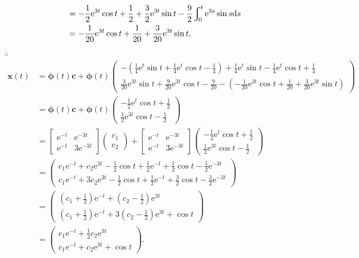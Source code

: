 \documentclass[12pt,UTF8]{ctexart}
\newcommand{\Int}[4]{\varint\nolimits_{#1}^{#2}#3\mathrm d#4}
\newcommand{\me}[0]{\mathrm e}
\begin{document}
\begin{enumerate}
\[\begin{aligned}
&=-\frac12\me^{3t}\cos t+\frac12+\frac32\me^{3t}\sin t-\frac92\Int0t{\me^{3s}\sin s}s\\
&=-\frac1{20}\me^{3t}\cos t+\frac1{20}+\frac3{20}\me^{3t}\sin t,
\end{aligned}\]
$\therefore$
\[\begin{aligned}
\bm x(t)&=\bm\phi(t)\bm c+\bm\phi(t)\begin{pmatrix}
-(\frac14\me^t\sin t+\frac14\me^t\cos t-\frac14)+\frac14\me^t\sin t-\frac14\me^t\cos t+\frac14\\
\frac3{20}\me^{3t}\sin t+\frac9{20}\me^{3t}\cos t-\frac9{20}-(-\frac1{20}\me^{3t}\cos t+\frac1{20}+\frac3{20}\me^{3t}\sin t)
\end{pmatrix}\\
&=\bm\phi(t)\bm c+\bm\phi(t)\begin{pmatrix}
-\frac12\me^t\cos t+\frac12\\
\frac12\me^{3t}\cos t-\frac12
\end{pmatrix}\\
&=\begin{bmatrix}\me^{-t}&\me^{-3t}\\\me^{-t}&3\me^{-3t}\end{bmatrix}\begin{pmatrix}
c_1\\c_2
\end{pmatrix}+\begin{bmatrix}\me^{-t}&\me^{-3t}\\\me^{-t}&3\me^{-3t}\end{bmatrix}\begin{pmatrix}
-\frac12\me^t\cos t+\frac12\\
\frac12\me^{3t}\cos t-\frac12
\end{pmatrix}\\
&=\begin{pmatrix}
c_1\me^{-t}+c_2\me^{3t}-\frac12\cos t+\frac12\me^{-t}+\frac12\cos t-\frac12\me^{-3t}\\
c_1\me^{-t}+3c_2\me^{3t}-\frac12\cos t+\frac12\me^{-t}+\frac32\cos t-\frac32\me^{-3t}
\end{pmatrix}\\
&=\begin{pmatrix}
(c_1+\frac12)\me^{-t}+(c_2-\frac12)\me^{3t}\\
(c_1+\frac12)\me^{-t}+3(c_2-\frac12)\me^{3t}+\cos t
\end{pmatrix}\\
&=\begin{pmatrix}
c_1\me^{-t}+\frac13c_2\me^{3t}\\
c_1\me^{-t}+c_2\me^{3t}+\cos t
\end{pmatrix}.
\end{aligned}\]
\end{enumerate}
\end{document}
